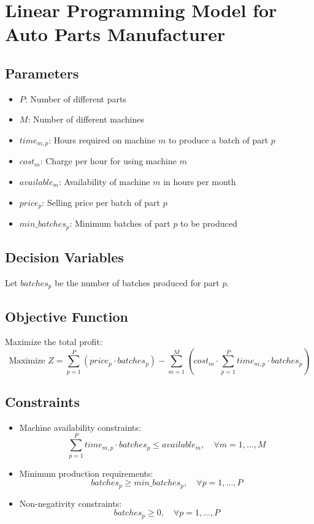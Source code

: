 \documentclass{article}
\begin{document}
\section*{Linear Programming Model for Auto Parts Manufacturer}

\subsection*{Parameters}

\begin{itemize}
    \item $P$: Number of different parts
    \item $M$: Number of different machines
    \item $time_{m,p}$: Hours required on machine $m$ to produce a batch of part $p$ 
    \item $cost_{m}$: Charge per hour for using machine $m$
    \item $available_{m}$: Availability of machine $m$ in hours per month
    \item $price_{p}$: Selling price per batch of part $p$
    \item $min\_batches_{p}$: Minimum batches of part $p$ to be produced
\end{itemize}

\subsection*{Decision Variables}

Let $batches_{p}$ be the number of batches produced for part $p$.

\subsection*{Objective Function}

Maximize the total profit:
\[
\text{Maximize } Z = \sum_{p=1}^{P} (price_{p} \cdot batches_{p}) - \sum_{m=1}^{M} (cost_{m} \cdot \sum_{p=1}^{P} time_{m,p} \cdot batches_{p})
\]

\subsection*{Constraints}

\begin{itemize}
    \item Machine availability constraints:
    \[
    \sum_{p=1}^{P} time_{m,p} \cdot batches_{p} \leq available_{m}, \quad \forall m = 1, \ldots, M
    \]
    
    \item Minimum production requirements:
    \[
    batches_{p} \geq min\_batches_{p}, \quad \forall p = 1, \ldots, P
    \]

    \item Non-negativity constraints:
    \[
    batches_{p} \geq 0, \quad \forall p = 1, \ldots, P
    \]
\end{itemize}
\end{document}
